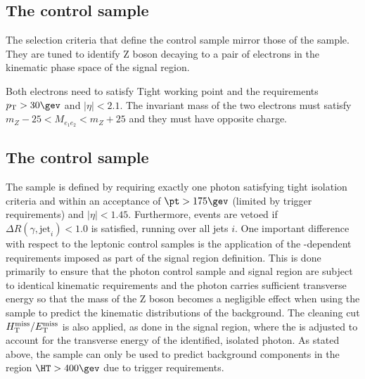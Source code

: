 \subsection{The \texorpdfstring{\eej}{electron plus jets} control sample}
\label{subsec:dielecontrolSelection}

The selection criteria that define the \eej control sample
mirror those of the \mmj sample. They are tuned
to identify Z boson decaying to a pair of electrons in the
kinematic phase space of the signal region.

Both electrons need to satisfy Tight working point and the
requirements $\Pt> 30\gev$ and $|\eta| < 2.1$. The invariant mass of
the two electrons must satisfy $m_{Z} - 25 < M_{e_1e_2} < m_{Z} + 25$
and they must have opposite charge.

\subsection{The \texorpdfstring{\gj}{photon plus jets} control sample}
\label{subsec:photoncontrolSelection}


The \gj sample is defined by requiring exactly one photon satisfying
tight isolation criteria and within an acceptance of $\pt > 175\gev$
(limited by trigger requirements) and $|\eta| < 1.45$. Furthermore,
events are vetoed if $\Delta R(\gamma,\textrm{jet}_i) < 1.0$ is
satisfied, running over all jets $i$. One important difference with
respect to the leptonic control samples is the application of the
\HT-dependent \alphat requirements imposed as part of the signal
region definition. This is done primarily to ensure that the photon
control sample and signal region are subject to identical kinematic
requirements and the photon carries sufficient transverse energy so
that the mass of the Z boson becomes a negligible effect when using
the \gj sample to predict the kinematic distributions of the \znunu
background. The cleaning cut $\mbox{$H_{\rm T}^{\rm miss}$}/\mbox{$E_\text{T}^{\rm miss}$}$ is also applied, as done in
the signal region, where the \met is adjusted to account for the
transverse energy of the identified, isolated photon. As stated above,
the \gj sample can only be used to predict background components in
the region $\HT > 400\gev$ due to trigger requirements.
